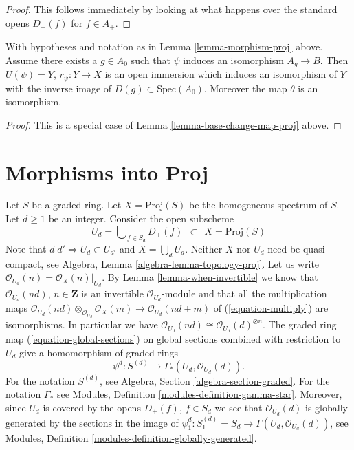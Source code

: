 \begin{proof}
This follows immediately by looking at what happens over the standard
opens $D_{+}(f)$ for $f \in A_{+}$.
\end{proof}

\begin{lemma}
\label{lemma-localization-map-proj}
With hypotheses and notation as in Lemma \ref{lemma-morphism-proj} above.
Assume there exists a $g \in A_0$ such that $\psi$ induces an
isomorphism $A_g \to B$. Then
$U(\psi) = Y$, $r_\psi : Y \to X$ is an open immersion
which induces an isomorphism of $Y$ with the inverse image
of $D(g) \subset \text{Spec}(A_0)$. Moreover the map $\theta$
is an isomorphism.
\end{lemma}

\begin{proof}
This is a special case of Lemma \ref{lemma-base-change-map-proj} above.
\end{proof}











\section{Morphisms into Proj}
\label{section-morphisms-proj}

\noindent
Let $S$ be a graded ring.
Let $X = \text{Proj}(S)$ be the homogeneous spectrum of $S$.
Let $d \geq 1$ be an integer.
Consider the open subscheme
\begin{equation}
\label{equation-Ud}
U_d = \bigcup\nolimits_{f  \in S_d} D_{+}(f)
\ \ \subset\ \ 
X = \text{Proj}(S)
\end{equation}
Note that $d | d' \Rightarrow U_d \subset U_{d'}$ and
$X = \bigcup_d U_d$. Neither $X$ nor $U_d$ need
be quasi-compact, see Algebra, Lemma \ref{algebra-lemma-topology-proj}.
Let us write $\mathcal{O}_{U_d}(n) = \mathcal{O}_X(n)|_{U_d}$.
By Lemma \ref{lemma-when-invertible}
we know that $\mathcal{O}_{U_d}(nd)$, $n \in \mathbf{Z}$
is an invertible $\mathcal{O}_{U_d}$-module and
that all the multiplication maps
$\mathcal{O}_{U_d}(nd) \otimes_{\mathcal{O}_{U_d}} \mathcal{O}_X(m)
\to \mathcal{O}_{U_d}(nd + m)$ of
(\ref{equation-multiply}) are isomorphisms. In particular we have
$\mathcal{O}_{U_d}(nd) \cong \mathcal{O}_{U_d}(d)^{\otimes n}$.
The graded ring map (\ref{equation-global-sections}) on global sections
combined with restriction to $U_d$ give a homomorphism of graded rings
\begin{equation}
\label{equation-psi-d}
\psi^d : S^{(d)} \longrightarrow \Gamma_*(U_d, \mathcal{O}_{U_d}(d)).
\end{equation}
For the notation $S^{(d)}$, see Algebra, Section \ref{algebra-section-graded}.
For the notation $\Gamma_*$ see
Modules, Definition \ref{modules-definition-gamma-star}.
Moreover, since $U_d$ is covered by the opens $D_{+}(f)$, $f \in S_d$
we see that $\mathcal{O}_{U_d}(d)$ is globally generated
by the sections in the image of
$\psi^d_1 : S^{(d)}_1 = S_d \to \Gamma(U_d, \mathcal{O}_{U_d}(d))$, see
Modules, Definition \ref{modules-definition-globally-generated}.

